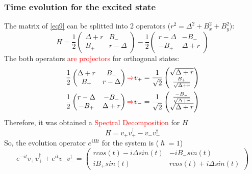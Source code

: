 \documentclass{article}
\begin{document}
\subsubsection{Time evolution for the excited state}
The matrix of \ref{eq9} can be splitted into 2 operators ($r^2=\Delta^2+B_x^2+B_y^2$):
\begin{equation}\label{eq10}H=\frac{1}{2}\begin{pmatrix} \Delta+r & B_- \\ B_+ & r-\Delta \end{pmatrix}-\frac{1}{2}\begin{pmatrix} r-\Delta & -B_- \\ -B_+ & \Delta+r\end{pmatrix}\end{equation}
The both operators \textcolor{red}{are projectors} for orthogonal states:
\begin{equation}\label{eq11}\begin{aligned}
\frac{1}{2}\begin{pmatrix} \Delta+r & B_- \\ B_+ & r-\Delta \end{pmatrix} 
\textcolor{red}{\Rightarrow}v_+= \frac{1}{\sqrt{2}}\begin{pmatrix}\sqrt{\Delta+r}\\ \frac{B_+}{\sqrt{\Delta+r}} \end{pmatrix}\\ 
\frac{1}{2}\begin{pmatrix} r-\Delta & -B_-  \\ -B_+& \Delta+r\end{pmatrix}\textcolor{red}{\Rightarrow}v_-=\frac{1}{\sqrt{2}}\begin{pmatrix}\frac{-B_-}{\sqrt{\Delta+r}} \\ \sqrt{\Delta+r} \end{pmatrix}
\end{aligned}\end{equation}
Therefore, it was obtained a \textcolor{red}{Spectral Decomposition} for $H$
\begin{equation}\label{eq12} H=v_+v_+^\dag-v_-v_-^\dag\end{equation}
So, the evolution operator $e^{iHt}$ for the system is ($\hslash=1$)
\begin{equation}\label{eq13}e^{-it}v_+v_+^\dag+e^{it}v_-v_-^\dag =\begin{pmatrix}rcos(t)-i\Delta sin(t)& -iB_- sin(t)\\ iB_+ sin(t) &rcos(t)+i\Delta sin(t)\end{pmatrix}\end{equation}
\end{document}
